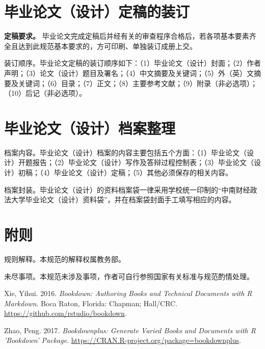 \documentclass[doublesided]{Style/ucasthesis}%
\begin{document}
\hypertarget{section-35}{%
\section{毕业论文（设计）定稿的装订}\label{section-35}}

\textbf{定稿要求。} 毕业论文完成定稿后并经有关的审查程序合格后，若各项基本要素齐全且达到此规范基本要求的，方可印刷、单独装订成册上交。

装订顺序。毕业论文定稿的装订顺序如下：（1）毕业论文（设计）封面；（2）作者声明；（3）论文（设计）题目及署名；（4）中文摘要及关键词；（5）外（英）文摘要及关键词；（6）目录；（7）正文；（8）主要参考文献；（9）附录（非必选项）；（10）后记（非必选项）。

\hypertarget{section-36}{%
\section{毕业论文（设计）档案整理}\label{section-36}}

档案内容。毕业论文（设计）档案的内容主要包括五个方面：（1）毕业论文（设计）开题报告；（2）毕业论文（设计）写作及答辩过程控制表；（3）毕业论文（设计）初稿；（4）毕业论文（设计）定稿；（5）其他必须保存的相关内容。

档案封装。毕业论文（设计）的资料档案袋一律采用学校统一印制的``中南财经政法大学毕业论文（设计）资料袋''，并在档案袋封面手工填写相应的内容。

\hypertarget{section-37}{%
\section{附则}\label{section-37}}

规则解释。本规范的解释权属教务部。

未尽事项。本规范未涉及事项，作者可自行参照国家有关标准与规范酌情处理。

\hypertarget{refs}{}
\leavevmode\hypertarget{ref-R-bookdown}{}%
Xie, Yihui. 2016. \emph{Bookdown: Authoring Books and Technical Documents with R Markdown}. Boca Raton, Florida: Chapman; Hall/CRC. \url{https://github.com/rstudio/bookdown}.

\leavevmode\hypertarget{ref-R-bookdownplus}{}%
Zhao, Peng. 2017. \emph{Bookdownplus: Generate Varied Books and Documents with R 'Bookdown' Package}. \url{https://CRAN.R-project.org/package=bookdownplus}.
\end{document}
